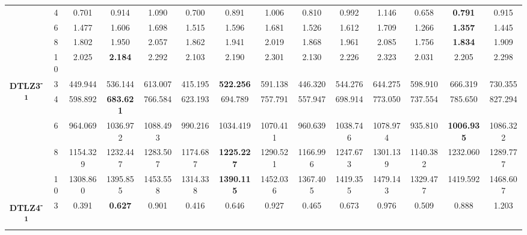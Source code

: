 \documentclass[onecolumn,10pt]{asme2ej}
\begin{document}
\begin{table}[!htb]
\begin{tabular}{|c|c|c|c|c|c|c|c|c|c|c|c|c|c|}
		& 4          & 0.701         & 0.914            & 1.090          & 0.700         & 0.891             & 1.006          & 0.810         & 0.992         & 1.146          & 0.658         & \textbf{0.791}    & 0.915          \\ \cline{2-14} 
		& 6          & 1.477         & 1.606            & 1.698          & 1.515         & 1.596             & 1.681          & 1.526         & 1.612         & 1.709          & 1.266         & \textbf{1.357}    & 1.445          \\ \cline{2-14} 
		& 8          & 1.802         & 1.950            & 2.057          & 1.862         & 1.941             & 2.019          & 1.868         & 1.961         & 2.085          & 1.756         & \textbf{1.834}    & 1.909          \\ \cline{2-14} 
		& 10         & 2.025         & \textbf{2.184}   & 2.292          & 2.103         & 2.190             & 2.301          & 2.130         & 2.226         & 2.323          & 2.031         & 2.205             & 2.298          \\ \hline
		\multirow{5}{*}{\textbf{DTLZ3\textsuperscript{-1}}} & 3          & 449.944       & 536.144          & 613.007        & 415.195       & \textbf{522.256}  & 591.138        & 446.320       & 544.276       & 644.275        & 598.910       & 666.319           & 730.355        \\ \cline{2-14} 
		& 4          & 598.892       & \textbf{683.621} & 766.584        & 623.193       & 694.789           & 757.791        & 557.947       & 698.914       & 773.050        & 737.554       & 785.650           & 827.294        \\ \cline{2-14} 
		& 6          & 964.069       & 1036.972         & 1088.493       & 990.216       & 1034.419          & 1070.411       & 960.639       & 1038.746      & 1078.974       & 935.810       & \textbf{1006.935} & 1086.322       \\ \cline{2-14} 
		& 8          & 1154.329      & 1232.447         & 1283.507       & 1174.687      & \textbf{1225.227} & 1290.521       & 1166.996      & 1247.673      & 1301.139       & 1140.382      & 1232.060          & 1289.777       \\ \cline{2-14} 
		& 10         & 1308.860      & 1395.855         & 1453.558       & 1314.338      & \textbf{1390.115} & 1452.036       & 1367.405      & 1419.355      & 1479.143       & 1329.477      & 1419.592          & 1468.607       \\ \hline
		\multirow{5}{*}{\textbf{DTLZ4\textsuperscript{-1}}} & 3          & 0.391         & \textbf{0.627}   & 0.901          & 0.416         & 0.646             & 0.927          & 0.465         & 0.673         & 0.976          & 0.509         & 0.888             & 1.203          \\ \cline{2-14} 

\end{tabular}
\end{table}
\end{document}
